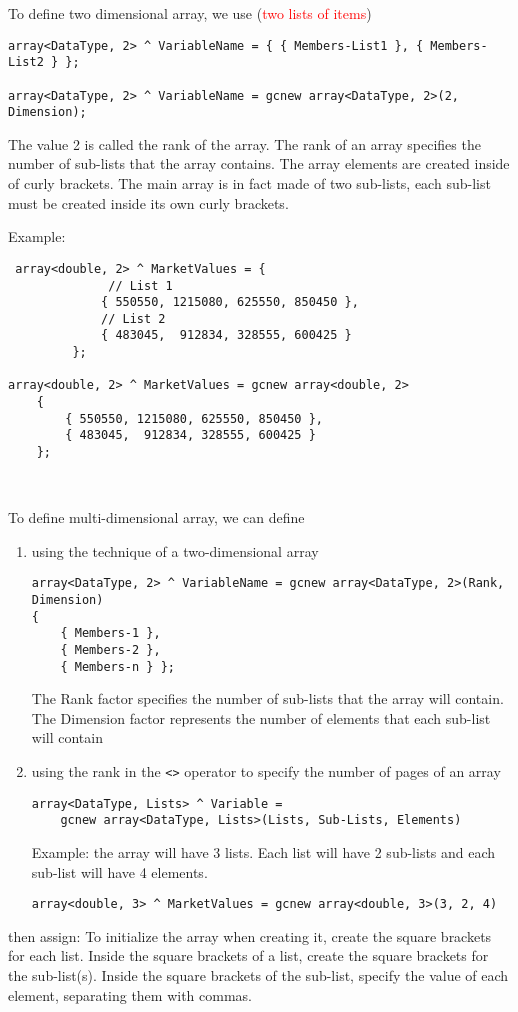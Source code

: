 To define two dimensional array, we use (\textcolor{red}{two lists of items})
\begin{verbatim}
array<DataType, 2> ^ VariableName = { { Members-List1 }, { Members-List2 } };

array<DataType, 2> ^ VariableName = gcnew array<DataType, 2>(2, Dimension);
\end{verbatim}
The value 2 is called the rank of the array. The rank of an array specifies the number of sub-lists that the array contains. 
The array elements are created inside of curly brackets.
The main array is in fact made of two sub-lists, each sub-list must be created inside its own curly brackets.  

Example:
\begin{verbatim}
 array<double, 2> ^ MarketValues = {
              // List 1 
             { 550550, 1215080, 625550, 850450 },
             // List 2
             { 483045,  912834, 328555, 600425 } 
         };

array<double, 2> ^ MarketValues = gcnew array<double, 2>
    {
        { 550550, 1215080, 625550, 850450 },
        { 483045,  912834, 328555, 600425 }
    };
    
    
\end{verbatim}

To define multi-dimensional array, we can define 
\begin{enumerate}
  \item using the technique of a two-dimensional array
  
\begin{verbatim}
array<DataType, 2> ^ VariableName = gcnew array<DataType, 2>(Rank, Dimension)
{
    { Members-1 },
    { Members-2 },
    { Members-n } };
\end{verbatim}
The Rank factor specifies the number of sub-lists that the array will contain. The Dimension factor represents the number of elements that each sub-list will contain
  
  \item using the rank in the \verb!<>! operator to specify the number of pages of an array
\begin{verbatim}
array<DataType, Lists> ^ Variable = 
	gcnew array<DataType, Lists>(Lists, Sub-Lists, Elements)
\end{verbatim}

Example: the array will have 3 lists. Each list will have 2 sub-lists and each
sub-list will have 4 elements.
\begin{verbatim}
array<double, 3> ^ MarketValues = gcnew array<double, 3>(3, 2, 4)
\end{verbatim}
\end{enumerate}
then assign: To initialize the array when creating it, create the square
brackets for each list. Inside the square brackets of a list, create the square
brackets for the sub-list(s). Inside the square brackets of the sub-list,
specify the value of each element, separating them with commas.

